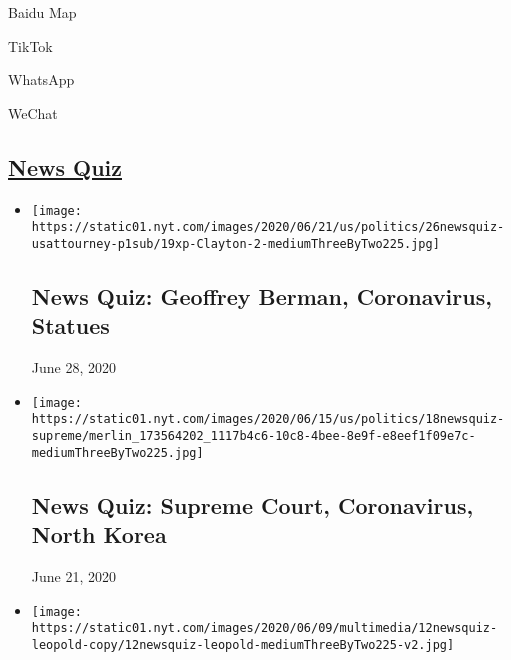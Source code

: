 Baidu Map

TikTok

WhatsApp

WeChat

\hypertarget{news-quiz}{%
\subsection{\texorpdfstring{\href{https://www.nytimes.com/spotlight/news-quiz}{News
Quiz}}{News Quiz}}\label{news-quiz}}

\begin{itemize}
\item
  \href{https://www.nytimes.com/interactive/2020/06/26/briefing/geoffrey-berman-coronavirus-statues-news-quiz.html}{}

  \texttt{[image: https://static01.nyt.com/images/2020/06/21/us/politics/26newsquiz-usattourney-p1sub/19xp-Clayton-2-mediumThreeByTwo225.jpg]}

  \hypertarget{news-quiz-geoffrey-berman-coronavirus-statues}{%
  \subsection{News Quiz: Geoffrey Berman, Coronavirus,
  Statues}\label{news-quiz-geoffrey-berman-coronavirus-statues}}

  June 28, 2020
\item
  \href{https://www.nytimes.com/interactive/2020/06/19/briefing/supreme-court-coronavirus-north-korea-news-quiz.html}{}

  \texttt{[image: https://static01.nyt.com/images/2020/06/15/us/politics/18newsquiz-supreme/merlin\_173564202\_1117b4c6-10c8-4bee-8e9f-e8eef1f09e7c-mediumThreeByTwo225.jpg]}

  \hypertarget{news-quiz-supreme-court-coronavirus-north-korea}{%
  \subsection{News Quiz: Supreme Court, Coronavirus, North
  Korea}\label{news-quiz-supreme-court-coronavirus-north-korea}}

  June 21, 2020
\item
  \href{https://www.nytimes.com/interactive/2020/06/12/briefing/world-health-organization-coronavirus-protests-news-quiz.html}{}

  \texttt{[image: https://static01.nyt.com/images/2020/06/09/multimedia/12newsquiz-leopold-copy/12newsquiz-leopold-mediumThreeByTwo225-v2.jpg]}


\end{itemize}
